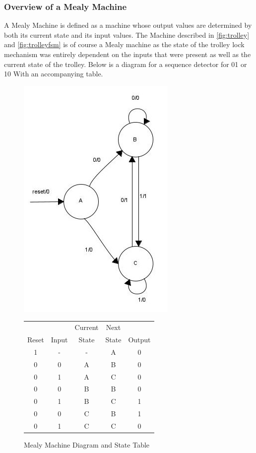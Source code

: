 \documentclass{article}
\begin{document}
\subsubsection{Overview of a Mealy Machine}
A Mealy Machine is defined as a machine whose output values are determined by both its current state and its input values. The Machine described in \figurename{\ref{fig:trolley}} and \figurename{\ref{fig:trolleyfsm}} is of course a Mealy machine as the state of the trolley lock mechanism was entirely dependent on the inputs that were present as well as the current state of the trolley. Below is a diagram for a sequence detector for 01 or 10 With an accompanying table. 
\begin {figure}[H]
	\begin{minipage}[t]{.48\linewidth}
		\vspace{0pt}
		\centering
		\includegraphics[scale = 1.5]{berkley-mealy.jpg}
	\end{minipage}
	\begin{minipage}[t]{.48\linewidth}
		\vspace{0pt}
		\begin{tabular}{c c c | c c}
			&	&	Current & Next	&	\\
			Reset & Input & State & State & Output\\
			\hline
			1 & - & - & A & 0 \\
			0 & 0 & A & B & 0 \\
			0 & 1 & A & C & 0 \\
			0 & 0 & B & B & 0 \\
			0 & 1 & B & C & 1 \\
			0 & 0 & C & B & 1 \\
			0 & 1 & C & C & 0 \\
		\end{tabular}
	\end{minipage}
	\label{fig:berkley-fsm-mealy}
	\caption{Mealy Machine Diagram and State Table}
\end {figure}
\end{document}
